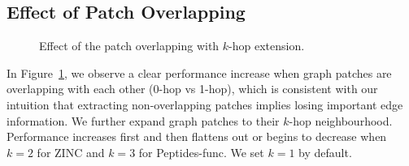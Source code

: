\documentclass{article}
\begin{document}
\subsection{Effect of Patch Overlapping}
\begin{figure}[!ht]
\centering     %
{}
\caption{Effect of the patch overlapping with $k$-hop extension.}
\label{fig: k-hop}
\end{figure}
In Figure~\ref{fig: k-hop}, we observe a clear performance increase when graph patches are overlapping with each other (0-hop vs 1-hop), which is consistent with our intuition that extracting non-overlapping patches implies losing important edge information. We further expand graph patches to their $k$-hop neighbourhood. Performance increases first and then flattens out or begins to decrease when $k=2$ for ZINC and $k=3$ for Peptides-func. We set $k=1$ by default.
\end{document}
